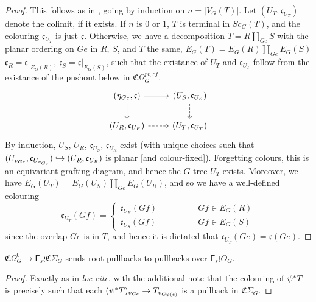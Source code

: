 \documentclass[a4paper,10pt
,draft
]{article}%
\renewcommand{\phi}{\varphi}
\newcommand{\UC}{\underline{\mathfrak C}}
\begin{document}
\begin{proof}
      This follows as in \cite[Prop. 3.41]{BP17}, going by induction on $n=|V_G(T)|$.
      Let $(U_T,\mathfrak c_{U_T})$ denote the colimit, if it exists.
      If $n$ is 0 or 1, $T$ is terminal in $Sc_G(T)$, and the colouring $\mathfrak c_{U_T}$ is just $\mathfrak c$.
      Otherwise, we have a decomposition $T = R \amalg_{Ge} S$ with
      the planar ordering on $Ge$ in $R$, $S$, and $T$ the same,
      $E_G(T) = E_G(R) \amalg_{Ge} E_G(S)$
      $\mathfrak c_{R} = \mathfrak c|_{E_G(R)}$,
      $\mathfrak c_{S} = \mathfrak c|_{E_G(S)}$,
      such that
      the existance of $U_T$ and $\mathfrak c_{U_T}$ follow from the existance of the pushout below in $\underline{\mathfrak C}\Omega_G^{pt,cf}$.
      \begin{equation}
            \begin{tikzcd}
                  (\eta_{Ge}, \mathfrak c) \arrow[d] \arrow[r]
                  &
                  (U_S, \mathfrak c_{U_S}) \arrow[d, dashed]
                  \\
                  (U_R, \mathfrak c_{U_R}) \arrow[r, dashed]
                  &
                  (U_T, \mathfrak c_{U_T})
            \end{tikzcd}
      \end{equation}
      By induction, $U_S$, $U_R$, $\mathfrak c_{U_S}$, $\mathfrak c_{U_R}$ exist
      (with unique choices such that $(U_{v_{Ge}}, \mathfrak c_{U_{v_{Ge}}}) \hookrightarrow(U_R, \mathfrak c_{U_R})$ is planar [and colour-fixed]).
      Forgetting colours, this is an equivariant grafting diagram, and hence the $G$-tree $U_T$ exists.
      Moreover, we have $E_G(U_T) = E_G(U_S) \amalg_{Ge} E_G(U_R)$, and so we have a well-defined colouring
      \begin{equation}
            \mathfrak c_{U_T}(Gf) =
            \begin{cases}
                  \mathfrak c_{U_R}(Gf) \qquad \qquad & Gf \in E_G(R) \\
                  \mathfrak c_{U_S}(Gf) & Gf \in E_G(S)
            \end{cases}
      \end{equation}
      since the overlap $Ge$ is in $T$, and hence it is dictated that $\mathfrak c_{U_T}(Ge) = \mathfrak c (Ge)$.
\end{proof}

\begin{lemma}[{cf. \cite[Lemma 3.63]{BP17}}]
      $\underline{\mathfrak C}\Omega_G^0 \to \mathsf F_s \wr \underline{\mathfrak C}\Sigma_G$
      sends root pullbacks to pullbacks over $\mathsf F_s \wr O_G$.
\end{lemma}
\begin{proof}
      Exactly as in \textit{loc cite}, with the additional note that
      the colouring of $\psi^{\**}T$ is precisely such that each $(\psi^{\**}T)_{v_{Ge}} \to T_{v_{G\phi(e)}}$
      is a pullback in $\UC \Sigma_G$.
\end{proof}
\end{document}

